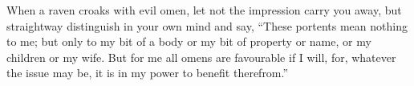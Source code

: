 When a raven croaks with evil omen,  let not the impression carry you away, but
straightway distinguish in your own mind and say, ``These portents mean nothing
to me;  but only  to my bit  of a  body or my  bit of property  or name,  or my
children  or my  wife. But  for me  all omens  are favourable  if I  will, for,
whatever the issue may be, it is in my power to benefit therefrom.''
